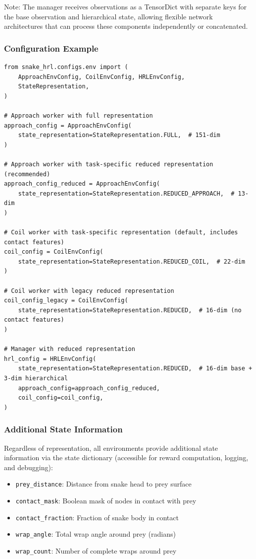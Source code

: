 \documentclass[11pt]{article}
\begin{document}
Note: The manager receives observations as a TensorDict with separate keys for the base observation and hierarchical state, allowing flexible network architectures that can process these components independently or concatenated.

\subsubsection{Configuration Example}

\begin{listing}[H]
\begin{verbatim}
from snake_hrl.configs.env import (
    ApproachEnvConfig, CoilEnvConfig, HRLEnvConfig,
    StateRepresentation,
)

# Approach worker with full representation
approach_config = ApproachEnvConfig(
    state_representation=StateRepresentation.FULL,  # 151-dim
)

# Approach worker with task-specific reduced representation (recommended)
approach_config_reduced = ApproachEnvConfig(
    state_representation=StateRepresentation.REDUCED_APPROACH,  # 13-dim
)

# Coil worker with task-specific representation (default, includes contact features)
coil_config = CoilEnvConfig(
    state_representation=StateRepresentation.REDUCED_COIL,  # 22-dim
)

# Coil worker with legacy reduced representation
coil_config_legacy = CoilEnvConfig(
    state_representation=StateRepresentation.REDUCED,  # 16-dim (no contact features)
)

# Manager with reduced representation
hrl_config = HRLEnvConfig(
    state_representation=StateRepresentation.REDUCED,  # 16-dim base + 3-dim hierarchical
    approach_config=approach_config_reduced,
    coil_config=coil_config,
)
\end{verbatim}
\caption{Configuring State Representation}
\end{listing}

\subsubsection{Additional State Information}

Regardless of representation, all environments provide additional state information via the state dictionary (accessible for reward computation, logging, and debugging):
\begin{itemize}
    \item \texttt{prey\_distance}: Distance from snake head to prey surface
    \item \texttt{contact\_mask}: Boolean mask of nodes in contact with prey
    \item \texttt{contact\_fraction}: Fraction of snake body in contact
    \item \texttt{wrap\_angle}: Total wrap angle around prey (radians)
    \item \texttt{wrap\_count}: Number of complete wraps around prey
\end{itemize}
\end{document}
